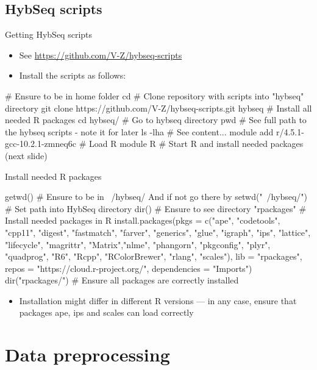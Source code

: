 \documentclass[compress,  xelatex, 11pt, xcolor=x11names, aspectratio=169,
	hyperref={
		bookmarks=true,
		unicode=true,
		colorlinks=true,
		pdftitle={HybSeq course},
		plainpages=false,
		pdfauthor={Vojtech Zeisek},
		pdfsubject={Practical processing of HybSeq target enrichment sequencing data on computing grids like MetaCentrum},
		pdfcreator={XeLaTeX},
		pdfkeywords={BASH, command line, GNU, HybSeq, Linux, MetaCentrum, sequencing shell, target enrichment},
		linkcolor=Turquoise4, %
		anchorcolor=DodgerBlue4, %
		citecolor=DodgerBlue4, %
		filecolor=DodgerBlue4, %
		menucolor=Tan4, %
		urlcolor=DarkOliveGreen4 %
		},
	url={hyphens, lowtilde} %
	]{beamer}
\renewcommand{\texttt}[1]{\colorbox{Cornsilk2}{{\ttfamily #1}}}
\begin{document}
\subsection{HybSeq scripts}

\begin{frame}[fragile]{Getting HybSeq scripts}
	\begin{itemize}
		\item See \url{https://github.com/V-Z/hybseq-scripts}
		\item Install the scripts as follows:
	\end{itemize}
	\begin{bashcode}
    # Ensure to be in home folder
    cd
    # Clone repository with scripts into "hybseq" directory
    git clone https://github.com/V-Z/hybseq-scripts.git hybseq
    # Install all needed R packages
    cd hybseq/ # Go to hybseq directory
    pwd # See full path to the hybseq scripts - note it for later
    ls -lha # See content...
    module add r/4.5.1-gcc-10.2.1-zmneq6c # Load R module
    R # Start R and install needed packages (next slide)
	\end{bashcode}
	\end{frame}

\begin{frame}[fragile]{Install needed R packages}
	\begin{spluscode}
    getwd() # Ensure to be in ~/hybseq/ And if not go there by
    setwd("~/hybseq/") # Set path into HybSeq directory
    dir() # Ensure to see directory "rpackages"
    # Install needed packages in R
    install.packages(pkgs = c("ape", "codetools", "cpp11", "digest", "fastmatch",
      "farver", "generics", "glue", "igraph", "ips", "lattice", "lifecycle",
      "magrittr", "Matrix","nlme", "phangorn", "pkgconfig", "plyr", "quadprog",
      "R6", "Rcpp", "RColorBrewer", "rlang", "scales"), lib = "rpackages",
      repos = "https://cloud.r-project.org/", dependencies = "Imports")
    dir("rpackages/") # Ensure all packages are correctly installed
	\end{spluscode}
	\begin{itemize}
		\item Installation might differ in different R versions --- in any case, ensure that packages \texttt{ape}, \texttt{ips} and \texttt{scales} can load correctly
	\end{itemize}
\end{frame}

\section{Data preprocessing}
\end{document}
